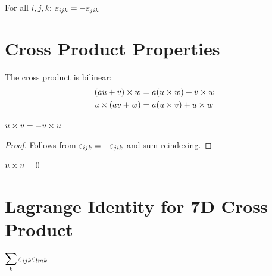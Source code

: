 \begin{theorem}\label{thm:epsilon_antisymm}
    \leanok
    For all $i, j, k$: $\varepsilon_{ijk} = -\varepsilon_{jik}$
\end{theorem}

\section{Cross Product Properties}

\begin{theorem}\label{thm:G2_cross_bilinear}
    \leanok
    The cross product is bilinear:
    \begin{align}
        (au + v) \times w &= a(u \times w) + v \times w \\
        u \times (av + w) &= a(u \times v) + u \times w
    \end{align}
\end{theorem}

\begin{theorem}\label{thm:G2_cross_antisymm}
    \leanok
    $u \times v = -v \times u$
\end{theorem}
\begin{proof}
    Follows from $\varepsilon_{ijk} = -\varepsilon_{jik}$ and sum reindexing.
\end{proof}

\begin{corollary}\label{cor:cross_self}
    \leanok
    $u \times u = 0$
\end{corollary}

\section{Lagrange Identity for 7D Cross Product}

\begin{definition}\label{def:epsilon_contraction}
    \leanok
    $\displaystyle\sum_k \varepsilon_{ijk} \varepsilon_{lmk}$
\end{definition}

